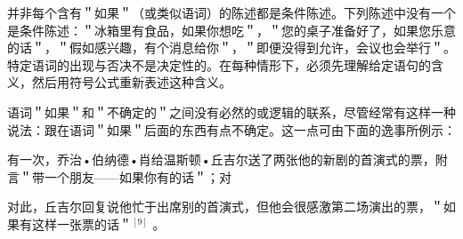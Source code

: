 并非每个含有＂如果＂（或类似语词）的陈述都是条件陈述。下列陈述中没有一个是条件陈述：＂冰箱里有食品，如果你想吃＂，＂您的桌子准备好了，如果您乐意的话＂，＂假如感兴趣，有个消息给你＂，＂即便没得到允许，会议也会举行＂。特定语词的出现与否决不是决定性的。在每种情形下，必须先理解给定语句的含义，然后用符号公式重新表述这种含义。

语词＂如果＂和＂不确定的＂之间没有必然的或逻辑的联系，尽管经常有这样一种说法：跟在语词＂如果＂后面的东西有点不确定。这一点可由下面的逸事所例示：

有一次，乔治•伯纳德•肖给温斯顿•丘吉尔送了两张他的新剧的首演式的票，附言＂带一个朋友——如果你有的话＂；对

对此，丘吉尔回复说他忙于出席别的首演式，但他会很感激第二场演出的票，＂如果有这样一张票的话＂${ }^{[9]}$ 。 